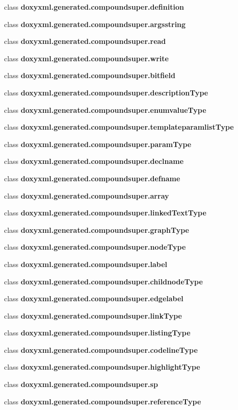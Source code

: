 \begin{DoxyCompactItemize}
class {\bf doxyxml.\+generated.\+compoundsuper.\+definition}
\item 
class {\bf doxyxml.\+generated.\+compoundsuper.\+argsstring}
\item 
class {\bf doxyxml.\+generated.\+compoundsuper.\+read}
\item 
class {\bf doxyxml.\+generated.\+compoundsuper.\+write}
\item 
class {\bf doxyxml.\+generated.\+compoundsuper.\+bitfield}
\item 
class {\bf doxyxml.\+generated.\+compoundsuper.\+description\+Type}
\item 
class {\bf doxyxml.\+generated.\+compoundsuper.\+enumvalue\+Type}
\item 
class {\bf doxyxml.\+generated.\+compoundsuper.\+templateparamlist\+Type}
\item 
class {\bf doxyxml.\+generated.\+compoundsuper.\+param\+Type}
\item 
class {\bf doxyxml.\+generated.\+compoundsuper.\+declname}
\item 
class {\bf doxyxml.\+generated.\+compoundsuper.\+defname}
\item 
class {\bf doxyxml.\+generated.\+compoundsuper.\+array}
\item 
class {\bf doxyxml.\+generated.\+compoundsuper.\+linked\+Text\+Type}
\item 
class {\bf doxyxml.\+generated.\+compoundsuper.\+graph\+Type}
\item 
class {\bf doxyxml.\+generated.\+compoundsuper.\+node\+Type}
\item 
class {\bf doxyxml.\+generated.\+compoundsuper.\+label}
\item 
class {\bf doxyxml.\+generated.\+compoundsuper.\+childnode\+Type}
\item 
class {\bf doxyxml.\+generated.\+compoundsuper.\+edgelabel}
\item 
class {\bf doxyxml.\+generated.\+compoundsuper.\+link\+Type}
\item 
class {\bf doxyxml.\+generated.\+compoundsuper.\+listing\+Type}
\item 
class {\bf doxyxml.\+generated.\+compoundsuper.\+codeline\+Type}
\item 
class {\bf doxyxml.\+generated.\+compoundsuper.\+highlight\+Type}
\item 
class {\bf doxyxml.\+generated.\+compoundsuper.\+sp}
\item 
class {\bf doxyxml.\+generated.\+compoundsuper.\+reference\+Type}
\item 

\end{DoxyCompactItemize}
